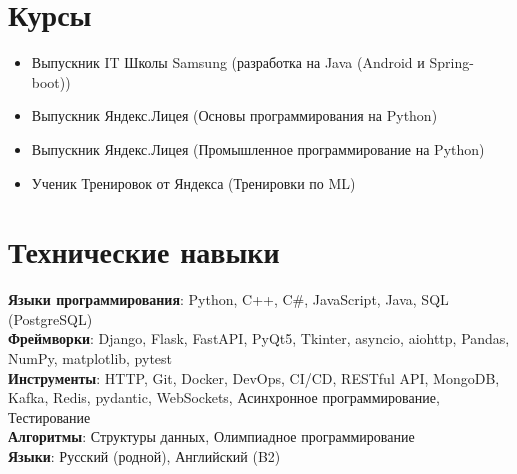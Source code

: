 \documentclass[letterpaper,11pt]{article}
\newcommand{\resumeItem}[1]{
  \item\small{
    {#1 \vspace{-2pt}}
  }
}
\newcommand{\resumeSubHeadingListStart}{\begin{itemize}[leftmargin=0.15in, label={}]}
\newcommand{\resumeSubHeadingListEnd}{\end{itemize}}
\begin{document}
\section{Курсы}
  \resumeSubHeadingListStart
    \resumeItem{Выпускник IT Школы Samsung (разработка на Java (Android и Spring-boot))}
    \resumeItem{Выпускник Яндекс.Лицея (Основы программирования на Python)}
    \resumeItem{Выпускник Яндекс.Лицея (Промышленное программирование на Python)}
    \resumeItem{Ученик Тренировок от Яндекса (Тренировки по ML)}
  \resumeSubHeadingListEnd

\section{Технические навыки}
 \begin{itemize}[leftmargin=0.15in, label={}]
    \small{\item{
     \textbf{Языки программирования}{: Python, C++, C\#, JavaScript, Java, SQL (PostgreSQL)} \\
     \textbf{Фреймворки}{: Django, Flask, FastAPI, PyQt5, Tkinter, asyncio, aiohttp, Pandas, NumPy, matplotlib, pytest} \\
     \textbf{Инструменты}{: HTTP, Git, Docker, DevOps, CI/CD, RESTful API, MongoDB, Kafka, Redis, pydantic, WebSockets, Асинхронное программирование, Тестирование} \\
     \textbf{Алгоритмы}{: Структуры данных, Олимпиадное программирование} \\
     \textbf{Языки}{: Русский (родной), Английский (B2)}
    }}
 \end{itemize}
\end{document}
